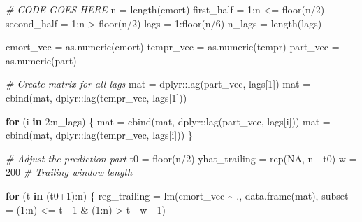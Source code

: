 \documentclass[
]{article}
\newenvironment{Shaded}{\begin{snugshade}}{\end{snugshade}}
\newcommand{\AttributeTok}[1]{\textcolor[rgb]{0.77,0.63,0.00}{#1}}
\newcommand{\CommentTok}[1]{\textcolor[rgb]{0.56,0.35,0.01}{\textit{#1}}}
\newcommand{\ConstantTok}[1]{\textcolor[rgb]{0.00,0.00,0.00}{#1}}
\newcommand{\ControlFlowTok}[1]{\textcolor[rgb]{0.13,0.29,0.53}{\textbf{#1}}}
\newcommand{\DecValTok}[1]{\textcolor[rgb]{0.00,0.00,0.81}{#1}}
\newcommand{\FunctionTok}[1]{\textcolor[rgb]{0.00,0.00,0.00}{#1}}
\newcommand{\NormalTok}[1]{#1}
\newcommand{\OtherTok}[1]{\textcolor[rgb]{0.56,0.35,0.01}{#1}}
\newcommand{\SpecialCharTok}[1]{\textcolor[rgb]{0.00,0.00,0.00}{#1}}
\begin{document}
\begin{Shaded}
\begin{Highlighting}[]
\CommentTok{\# CODE GOES HERE}
\NormalTok{n }\OtherTok{=} \FunctionTok{length}\NormalTok{(cmort)}
\NormalTok{first\_half }\OtherTok{=} \DecValTok{1}\SpecialCharTok{:}\NormalTok{n }\SpecialCharTok{\textless{}=} \FunctionTok{floor}\NormalTok{(n}\SpecialCharTok{/}\DecValTok{2}\NormalTok{)}
\NormalTok{second\_half }\OtherTok{=} \DecValTok{1}\SpecialCharTok{:}\NormalTok{n }\SpecialCharTok{\textgreater{}} \FunctionTok{floor}\NormalTok{(n}\SpecialCharTok{/}\DecValTok{2}\NormalTok{)}
\NormalTok{lags }\OtherTok{=} \DecValTok{1}\SpecialCharTok{:}\FunctionTok{floor}\NormalTok{(n}\SpecialCharTok{/}\DecValTok{6}\NormalTok{)}
\NormalTok{n\_lags }\OtherTok{=} \FunctionTok{length}\NormalTok{(lags)}

\NormalTok{cmort\_vec }\OtherTok{=} \FunctionTok{as.numeric}\NormalTok{(cmort)}
\NormalTok{tempr\_vec }\OtherTok{=} \FunctionTok{as.numeric}\NormalTok{(tempr)}
\NormalTok{part\_vec }\OtherTok{=} \FunctionTok{as.numeric}\NormalTok{(part)}

\CommentTok{\# Create matrix for all lags}
\NormalTok{mat }\OtherTok{=}\NormalTok{ dplyr}\SpecialCharTok{::}\FunctionTok{lag}\NormalTok{(part\_vec, lags[}\DecValTok{1}\NormalTok{])}
\NormalTok{mat }\OtherTok{=} \FunctionTok{cbind}\NormalTok{(mat, dplyr}\SpecialCharTok{::}\FunctionTok{lag}\NormalTok{(tempr\_vec, lags[}\DecValTok{1}\NormalTok{]))}

\ControlFlowTok{for}\NormalTok{ (i }\ControlFlowTok{in} \DecValTok{2}\SpecialCharTok{:}\NormalTok{n\_lags) \{}
\NormalTok{  mat }\OtherTok{=} \FunctionTok{cbind}\NormalTok{(mat, dplyr}\SpecialCharTok{::}\FunctionTok{lag}\NormalTok{(part\_vec, lags[i]))}
\NormalTok{  mat }\OtherTok{=} \FunctionTok{cbind}\NormalTok{(mat, dplyr}\SpecialCharTok{::}\FunctionTok{lag}\NormalTok{(tempr\_vec, lags[i]))}
\NormalTok{\}}

\CommentTok{\# Adjust the prediction part}
\NormalTok{t0 }\OtherTok{=} \FunctionTok{floor}\NormalTok{(n}\SpecialCharTok{/}\DecValTok{2}\NormalTok{)}
\NormalTok{yhat\_trailing }\OtherTok{=} \FunctionTok{rep}\NormalTok{(}\ConstantTok{NA}\NormalTok{, n }\SpecialCharTok{{-}}\NormalTok{ t0)}
\NormalTok{w }\OtherTok{=} \DecValTok{200} \CommentTok{\# Trailing window length}

\ControlFlowTok{for}\NormalTok{ (t }\ControlFlowTok{in}\NormalTok{ (t0}\SpecialCharTok{+}\DecValTok{1}\NormalTok{)}\SpecialCharTok{:}\NormalTok{n) \{}
\NormalTok{  reg\_trailing }\OtherTok{=} \FunctionTok{lm}\NormalTok{(cmort\_vec }\SpecialCharTok{\textasciitilde{}}\NormalTok{ .,}
                    \FunctionTok{data.frame}\NormalTok{(mat),}
                    \AttributeTok{subset =}\NormalTok{ (}\DecValTok{1}\SpecialCharTok{:}\NormalTok{n) }\SpecialCharTok{\textless{}=}\NormalTok{ t }\SpecialCharTok{{-}} \DecValTok{1} \SpecialCharTok{\&}\NormalTok{ (}\DecValTok{1}\SpecialCharTok{:}\NormalTok{n) }\SpecialCharTok{\textgreater{}}\NormalTok{ t }\SpecialCharTok{{-}}\NormalTok{ w }\SpecialCharTok{{-}} \DecValTok{1}\NormalTok{)}
  

\end{Highlighting}
\end{Shaded}
\end{document}
